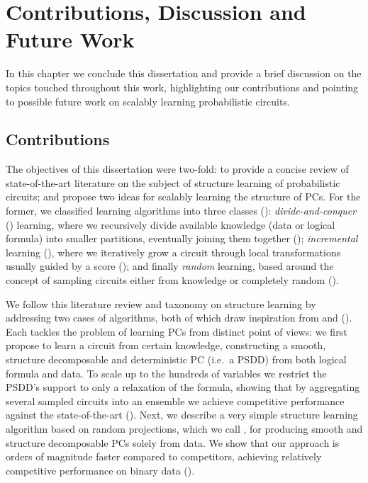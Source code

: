 \chapter{Contributions, Discussion and Future Work}
\label{ch:conclusion}

In this chapter we conclude this dissertation and provide a brief discussion on the topics touched
throughout this work, highlighting our contributions and pointing to possible future work on
scalably learning probabilistic circuits.

\section{Contributions}

The objectives of this dissertation were two-fold: to provide a concise review of state-of-the-art
literature on the subject of structure learning of probabilistic circuits; and propose two ideas
for scalably learning the structure of PCs. For the former, we classified learning algorithms into
three classes (): \emph{divide-and-conquer} (\divclass{}) learning, where we
recursively divide available knowledge (data or logical formula) into smaller partitions,
eventually joining them together (); \emph{incremental} learning (\incrclass{}),
where we iteratively grow a circuit through local transformations usually guided by a score
(); and finally \emph{random} learning, based around the concept of sampling
circuits either from knowledge or completely random ().

We follow this literature review and taxonomy on structure learning by addressing two cases of
\randclass{} algorithms, both of which draw inspiration from \divclass{} and \incrclass{}
(). Each tackles the problem of learning PCs from distinct point of views: we
first propose  to learn a circuit from certain knowledge, constructing a
smooth, structure decomposable and deterministic PC (i.e.\ a PSDD) from both logical formula and
data. To scale up to the hundreds of variables we restrict the PSDD's support to only a relaxation
of the formula, showing that by aggregating several sampled circuits into an ensemble we achieve
competitive performance against the state-of-the-art (). Next, we describe a very
simple \randclass{} structure learning algorithm based on random projections, which we call
, for producing smooth and structure decomposable PCs solely from data. We show
that our approach is orders of magnitude faster compared to competitors, achieving relatively
competitive performance on binary data ().


